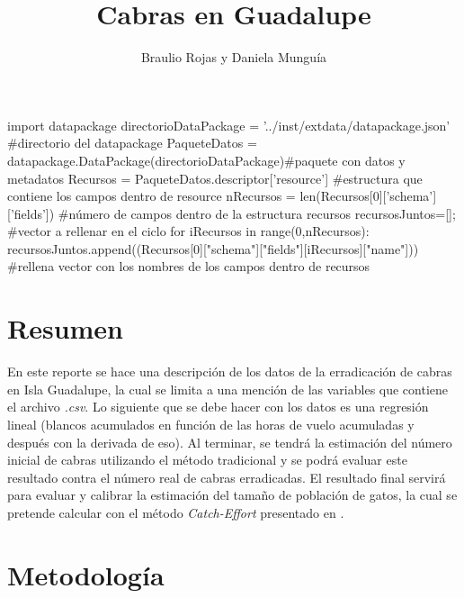 \documentclass{article}
\author{Braulio Rojas y Daniela Mungu\'ia}
\title{Cabras en Guadalupe}
\begin{document}
\maketitle

\begin{pycode}
import datapackage
directorioDataPackage = '../inst/extdata/datapackage.json'   #directorio del datapackage
PaqueteDatos = datapackage.DataPackage(directorioDataPackage)#paquete con datos y metadatos
Recursos = PaqueteDatos.descriptor['resource']               #estructura que contiene los campos dentro de resource
nRecursos = len(Recursos[0]['schema']['fields'])             #número de campos dentro de la estructura recursos
recursosJuntos=[];                                           #vector a rellenar en el ciclo
for iRecursos in range(0,nRecursos):
    recursosJuntos.append((Recursos[0]["schema"]["fields"][iRecursos]["name"])) #rellena vector con los nombres de los campos dentro de recursos

\end{pycode}


\section*{Resumen} %
En este reporte se hace una descripci\'on de los datos de la erradicaci\'on 
de cabras en Isla Guadalupe, la cual se limita a una menci\'on de las variables 
que contiene el archivo \textit{.csv}. Lo 
siguiente que se debe hacer con los datos es una regresi\'on lineal (blancos 
acumulados en funci\'on de las horas de vuelo acumuladas y despu\'es con la 
derivada de eso). Al terminar, se tendr\'a la estimación del n\'umero inicial 
de cabras utilizando el m\'etodo tradicional y se podr\'a evaluar este resultado 
contra el n\'umero real de cabras erradicadas. El resultado final servir\'a para 
evaluar y calibrar la estimaci\'on del tamaño de poblaci\'on de gatos, la cual 
se pretende calcular con el método \textit{Catch-Effort} presentado en \cite{krebs2012}.


\section*{Metodolog\'ia} %
\end{document}
